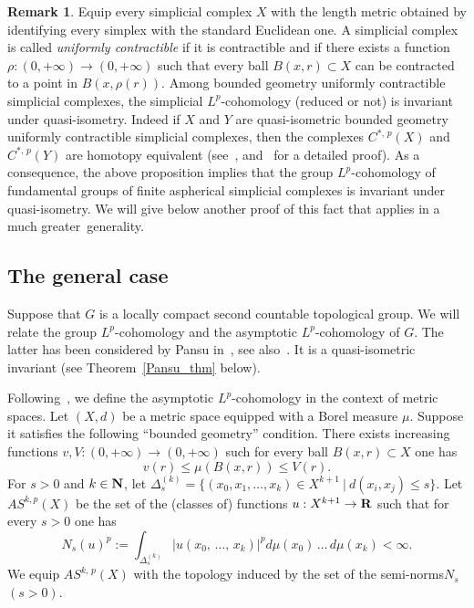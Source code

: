 \documentclass[11pt]{article}
\theoremstyle{definition}
\newtheorem{rema}[theo]{Remark}
\numberwithin{equation}{section}
\numberwithin{figure}{section}
\numberwithin{table}{section}
\begin{document}
\begin{rema}\label{simplicial_remark}
Equip every simplicial complex $X$ with the length metric obtained by identifying every simplex with the standard
Euclidean one. A simplicial complex is called \emph{uniformly contractible} if it is contractible and if there exists a function $\rho: (0, +\infty) \to (0, +\infty)$ such that every ball $B(x,r) \subset X$ can be contracted to a point in $B(x,\rho (r))$. Among bounded geometry uniformly contractible simplicial complexes, the simplicial $L^p$-cohomology (reduced or not) is invariant under quasi-isometry. Indeed if $X$ and $Y$ are quasi-isometric bounded geometry uniformly contractible simplicial complexes, then the complexes $C^{*,\,p}(X)$ and $C^{*,\,p}(Y)$ are homotopy equivalent (see~\cite[p.~219]{G}, and~\cite{BP2} for a detailed proof). As a consequence, the above proposition implies that the group $L^p$-cohomology of fundamental groups of finite aspherical simplicial complexes is invariant under quasi-isometry. We will give below another proof of this fact that applies in a much greater~generality.
\end{rema}


\subsection*{The general case}
Suppose that $G$ is a locally compact second countable topological group. We will relate the group $L^p$-cohomology and the asymptotic $L^p$-cohomology of $G$. The latter has been considered by Pansu in~\cite{Pa95}, see also~\cite{Genton}. It is a quasi-isometric invariant (see Theorem~\ref{Pansu_thm} below).

Following~\cite{Pa95}, we define the asymptotic $L^p$-cohomology in the context of metric spaces. Let $(X, d)$ be a metric space equipped with a Borel measure $\mu$. Suppose it satisfies the following ``bounded geometry'' condition. There exists increasing functions $v, V: (0, +\infty) \to (0, +\infty)$ such for every ball $B(x, r) \subset X$ one has
\[
v(r) \leqslant \mu (B(x,r)) \leqslant V(r).
\]
For $s >0$ and $k\in {\bf N}$, let $\Delta _s ^{(k)} = \{(x_0, x_1,\dots, x_k) \in X ^{k+1}~\vert~d(x_i, x_j) \leqslant s\}$. Let $AS^{k,p}(X)$ be the set of the (classes of) functions $u: X^{k+1} \to {\bf R}$ such that for every $s >0$ one has
\[
N_s (u)^p:= \int _{\Delta _s ^{(k)}} \vert u (x_0,\,\dots,\,x_k)\vert ^p d\mu(x_0)\,\dots\, d\mu (x_k) < \infty.
\]
We equip $AS^{k,\,p}(X)$ with the topology induced by the set of the semi-norms\linebreak$N_s$ $(s>0)$.
\end{document}
